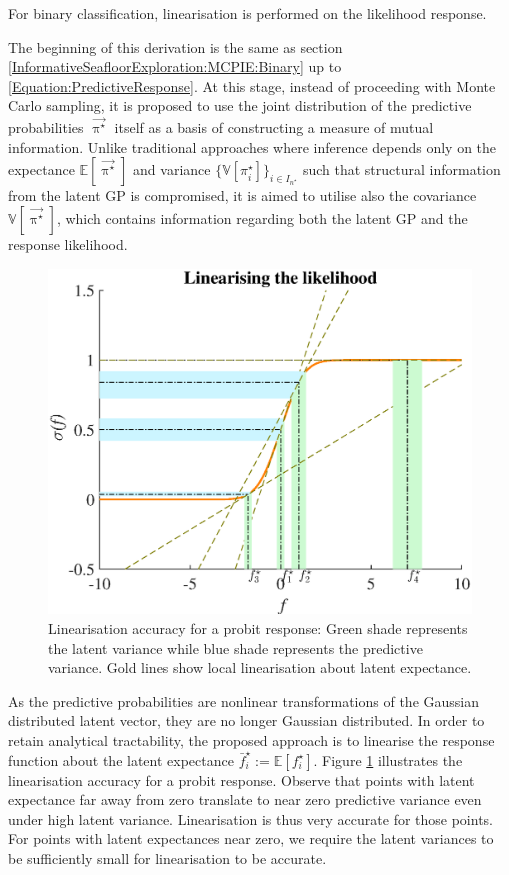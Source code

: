			For binary classification, linearisation is performed on the likelihood response.
					
			The beginning of this derivation is the same as section \ref{InformativeSeafloorExploration:MCPIE:Binary} up to \eqref{Equation:PredictiveResponse}. At this stage, instead of proceeding with Monte Carlo sampling, it is proposed to use the joint distribution of the predictive probabilities $\vec{\uppi^{\star}}$ itself as a basis of constructing a measure of mutual information. Unlike traditional approaches where inference depends only on the expectance $\mathbb{E}[\vec{\uppi^{\star}}]$ and variance $\{\mathbb{V}[\pi^{\star}_{i}]\}_{i \in I_{n^{\star}}}$ such that structural information from the latent GP is compromised, it is aimed to utilise also the covariance $\mathbb{V}[\vec{\uppi^{\star}}]$, which contains information regarding both the latent GP and the response likelihood.
		
			\begin{figure}[!htbp]
				\centering
					\includegraphics[width = 0.6\linewidth]{Figures/linearisation.eps}
				\caption{Linearisation accuracy for a probit response: Green shade represents the latent variance while blue shade represents the predictive variance. Gold lines show local linearisation about latent expectance.}
				\label{Figure:Linearisation}
			\end{figure}
				
			As the predictive probabilities are nonlinear transformations of the Gaussian distributed latent vector, they are no longer Gaussian distributed. In order to retain analytical tractability, the proposed approach is to linearise the response function about the latent expectance $\bar{f}^{\star}_{i} := \mathbb{E}[f^{\star}_{i}]$. Figure \ref{Figure:Linearisation} illustrates the linearisation accuracy for a probit response. Observe that points with latent expectance far away from zero translate to near zero predictive variance even under high latent variance. Linearisation is thus very accurate for those points. For points with latent expectances near zero, we require the latent variances to be sufficiently small for linearisation to be accurate.
			
